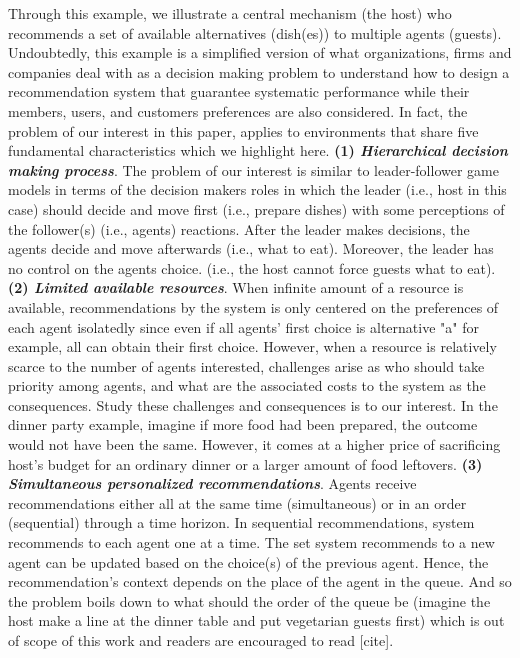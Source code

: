 \documentclass[11pt, letterpaper]{article}
\begin{document}
Through this example, we illustrate a central mechanism (the host) who recommends a set of available alternatives (dish(es)) to multiple agents (guests). Undoubtedly, this example is a simplified version of what organizations, firms and companies deal with as a decision making problem to understand how to design a recommendation system that guarantee systematic performance while their members, users, and customers preferences are also considered. In fact, the problem of our interest in this paper, applies to environments that share five fundamental characteristics which we highlight here. \textbf{(1) \emph{Hierarchical decision making process}}. The problem of our interest is similar to leader-follower game models in terms of the decision makers roles in which the leader (i.e., host in this case) should decide and move first (i.e., prepare dishes) with some perceptions of the follower(s) (i.e., agents) reactions. After the leader makes decisions, the agents decide and move afterwards (i.e., what to eat). Moreover, the leader has no control on the agents choice. (i.e., the host cannot force guests what to eat). \textbf{(2) \emph{Limited available resources}}. When infinite amount of a resource is available, recommendations by the system is only centered on the preferences of each agent isolatedly since even if all agents' first choice is alternative "a" for example, all can obtain their first choice. However, when a resource is relatively scarce to the number of agents interested, challenges arise as who should take priority among agents, and what are the associated costs to the system as the consequences. Study these challenges and consequences is to our interest. 
In the dinner party example, imagine if more food had been prepared, the outcome would not have been the same. However, it comes at a higher price of sacrificing host's budget for an ordinary dinner or a larger amount of food leftovers. \textbf{(3) \emph{Simultaneous personalized recommendations}}. Agents receive recommendations either all at the same time (simultaneous) or in an order (sequential) through a time horizon. In sequential recommendations, system recommends to each agent one at a time. The set system recommends to a new agent can be updated based on the choice(s) of the previous agent. Hence, the recommendation's context depends on the place of the agent in the queue. And so the problem boils down to what should the order of the queue be (imagine the host make a line at the dinner table and put vegetarian guests first) which is out of scope of this work and readers are encouraged to read [cite]. 
\end{document}
